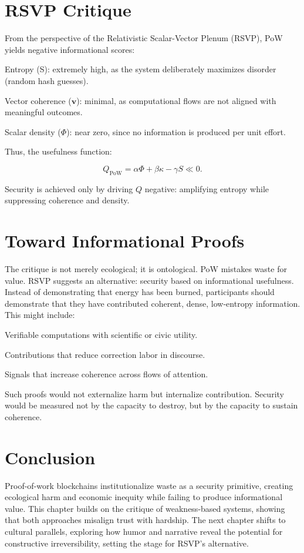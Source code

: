 \documentclass{book}
\begin{document}
\section{RSVP Critique}

From the perspective of the Relativistic Scalar-Vector Plenum (RSVP), PoW yields negative informational scores:

Entropy (S): extremely high, as the system deliberately maximizes disorder (random hash guesses).

Vector coherence (\(\mathbf{v}\)): minimal, as computational flows are not aligned with meaningful outcomes.

Scalar density (\(\Phi\)): near zero, since no information is produced per unit effort.

Thus, the usefulness function:

\[ Q_{\text{PoW}} = \alpha \Phi + \beta \kappa - \gamma S \ll 0. \]

Security is achieved only by driving \( Q \) negative: amplifying entropy while suppressing coherence and density.

\section{Toward Informational Proofs}

The critique is not merely ecological; it is ontological. PoW mistakes waste for value. RSVP suggests an alternative: security based on informational usefulness. Instead of demonstrating that energy has been burned, participants should demonstrate that they have contributed coherent, dense, low-entropy information. This might include:

Verifiable computations with scientific or civic utility.

Contributions that reduce correction labor in discourse.

Signals that increase coherence across flows of attention.

Such proofs would not externalize harm but internalize contribution. Security would be measured not by the capacity to destroy, but by the capacity to sustain coherence.

\section{Conclusion}

Proof-of-work blockchains institutionalize waste as a security primitive, creating ecological harm and economic inequity while failing to produce informational value. This chapter builds on the critique of weakness-based systems, showing that both approaches misalign trust with hardship. The next chapter shifts to cultural parallels, exploring how humor and narrative reveal the potential for constructive irreversibility, setting the stage for RSVP’s alternative.
\end{document}
